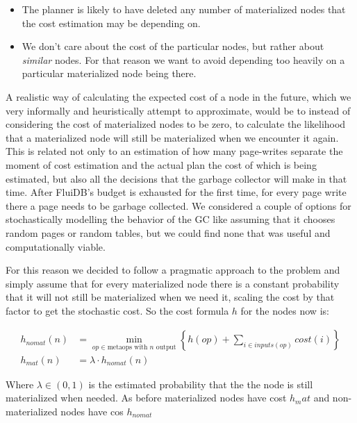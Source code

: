 \begin{itemize}
\item The planner is likely to have deleted any number of materialized
nodes that the cost estimation may be depending on.
\item We don't care about the cost of the particular nodes, but rather
about \emph{similar} nodes. For that reason we want to avoid depending
too heavily on a particular materialized node being there.
\end{itemize}

A realistic way of calculating the expected cost of a node in the
future, which we very informally and heuristically attempt to
approximate, would be to instead of considering the cost of
materialized nodes to be zero, to calculate the likelihood that a
materialized node will still be materialized when we encounter it
again. This is related not only to an estimation of how many
page-writes separate the moment of cost estimation and the actual plan
the cost of which is being estimated, but also all the decisions that
the garbage collector will make in that time. After FluiDB's budget is
exhausted for the first time, for every page write there a page needs
to be garbage collected. We considered a couple of options for
stochastically modelling the behavior of the GC like assuming that it
chooses random pages or random tables, but we could find none that was
useful and computationally viable.

For this reason we decided to follow a pragmatic approach to the
problem and simply assume that for every materialized node there is a
constant probability that it will not still be materialized when we
need it, scaling the cost by that factor to get the stochastic
cost. So the cost formula \(h\) for the nodes now is:

\begin{align*}
  h_{nomat}(n) &= \min\limits_{op \in \text{metaops with \(n\) output}} \left\{ h(op) + \sum\limits_{i \in inputs(op)} cost(i)  \right\} \\
  h_{mat}(n) &= \lambda \cdot h_{nomat}(n)
\end{align*}

Where \(\lambda \in (0,1)\) is the estimated probability that the the
node is still materialized when needed. As before materialized nodes
have cost \(h_mat\) and non-materialized nodes have cos \(h_{nomat}\)
